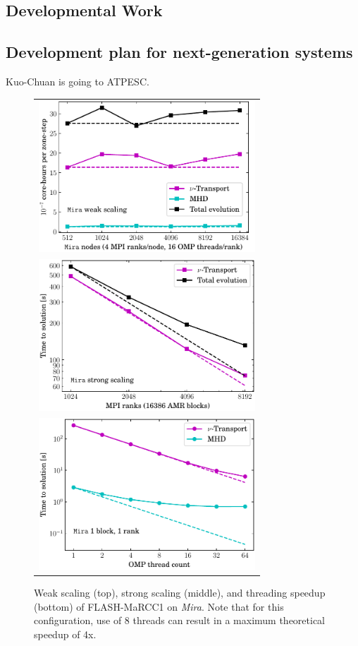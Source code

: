 \subsection{Developmental Work}

\subsection{Development plan for next-generation systems}

Kuo-Chuan is going to ATPESC.

\begin{figure}
  \begin{tabular}{l}
    \includegraphics[width=3.2in]{figs/wkScaleSparkM1} \\
    \includegraphics[width=3.2in]{figs/strScaleSparkM1} \\
    \includegraphics[width=3.2in]{figs/thrdSpeedupSparkM1}
  \end{tabular}
  \caption{Weak scaling (top), strong scaling (middle), and threading
  speedup (bottom) of FLASH-MaRCC1 on {\it Mira}.  Note that for this configuration, use of 8 threads can result in a maximum theoretical speedup of 4x.}
  \label{fig:scaling}
\end{figure}

